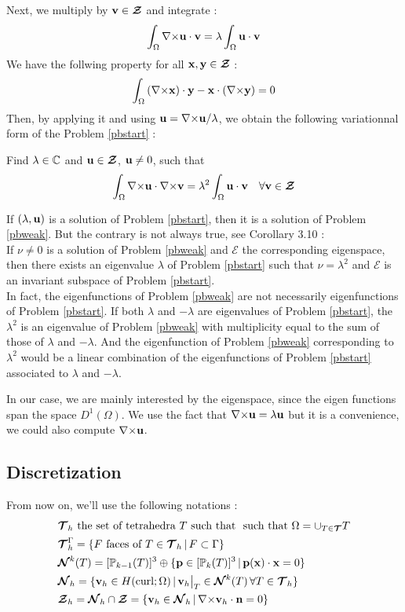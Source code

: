 Next, we multiply by ${\mathbf{v}}\in{\bm{\mathcal{Z}}}$ and integrate :
\[ \int_\Omega {\nabla\times}{\mathbf{u}}\cdot{\mathbf{v}} = \lambda\int_\Omega
{\mathbf{u}}\cdot{\mathbf{v}} \]
We have the follwing property for all ${\mathbf{x}},{\mathbf{y}}\in{\bm{\mathcal{Z}}}$ :
\[ \int_\Omega \left({\nabla\times}{\mathbf{x}}\right)\cdot{\mathbf{y}} -
{\mathbf{x}}\cdot\left({\nabla\times}{\mathbf{y}}\right) = 0 \]
Then, by applying it and using
${\mathbf{u}}={\nabla\times}{\mathbf{u}}/\lambda$, we obtain the following
variationnal form of the Problem \ref{pbstart} :
\begin{pb}\label{pbweak}
Find $\lambda\in{\mathbb{C}}$ and ${\mathbf{u}}\in{\bm{\mathcal{Z}}}$, ${\mathbf{u}}\ne 0$, such
that
\[ \int_\Omega {\nabla\times}{\mathbf{u}}\cdot{\nabla\times}{\mathbf{v}} =
\lambda^2\int_\Omega {\mathbf{u}}\cdot{\mathbf{v}} \quad \forall
{\mathbf{v}}\in{\bm{\mathcal{Z}}} \]
\end{pb}

If $(\lambda,{\mathbf{u}})$ is a solution of Problem \ref{pbstart}, then it is a
solution of Problem \ref{pbweak}. But the contrary is not always true,
see \cite{Venegas2013} Corollary 3.10 :\\

If $\nu\ne 0$ is a solution of Problem \ref{pbweak} and $\bm{\mathcal{E}}$ the
corresponding eigenspace, then there exists an eigenvalue $\lambda$ of
Problem \ref{pbstart} such that $\nu=\lambda^2$ and $\bm{\mathcal{E}}$ is an
invariant subspace of Problem \ref{pbstart}.\\

In fact, the eigenfunctions of Problem \ref{pbweak} are not necessarily
eigenfunctions of Problem \ref{pbstart}. If both $\lambda$ and $-\lambda$
are eigenvalues of Problem \ref{pbstart}, the $\lambda^2$ is an eigenvalue
of Problem \ref{pbweak} with multiplicity equal to the sum of those of
$\lambda$ and $-\lambda$. And the eigenfunction of Problem \ref{pbweak}
corresponding to $\lambda^2$ would be a linear combination of the
eigenfunctions of Problem \ref{pbstart} associated to $\lambda$ and
$-\lambda$.\\

\begin{rk}
In our case, we are mainly interested by the eigenspace, since the
eigen functions span the space $D^1(\Omega)$. We use the fact that
${\nabla\times}{\mathbf{u}}=\lambda{\mathbf{u}}$ but it is a convenience, we could
also compute ${\nabla\times}{\mathbf{u}}$.
\end{rk}

\subsection{Discretization}
From now on, we'll use the following notations :
\begin{align*}
&{\bm{\mathcal{T}}}_h\mbox{ the set of tetrahedra } T \mbox{ such that }
\mbox{ such that } \Omega=\cup_{T\in{\bm{\mathcal{T}}}}T\\
&{\bm{\mathcal{T}}}_h^\Gamma =\{F\mbox{ faces of } T\in {\bm{\mathcal{T}}}_h \,|\, F\subset \Gamma
\}\\
&{\bm{\mathcal{N}}}^k(T)=[{\mathbb{P}}_{k-1}(T)]^3\oplus\{{\mathbf{p}}\in[{\mathbb{P}}_k(T)]^3 \,|\,
{\mathbf{p(x)}}\cdot{\mathbf{x}}=0 \}\\
&{\bm{\mathcal{N}}}_h=\{{\mathbf{v}}_h\in H(\mathrm{curl};\Omega) \,|\,
{\mathbf{v}}_h{\big\rvert_{T}}\in{\bm{\mathcal{N}}}^k(T)\, \forall T\in {\bm{\mathcal{T}}}_h \}\\
&{\bm{\mathcal{Z}}}_h={\bm{\mathcal{N}}}_h\cap{\bm{\mathcal{Z}}}=\{{\mathbf{v}}_h\in{\bm{\mathcal{N}}}_h \,|\,
{\nabla\times}{\mathbf{v}}_h\cdot{\mathbf{n}} = 0 \}
\end{align*}


